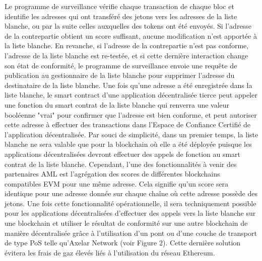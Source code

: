 ﻿\documentclass[a4paper]{article}
\begin{document}
Le programme de surveillance vérifie chaque transaction de chaque bloc et identifie les adresses qui ont transféré des jetons vers les adresses de la liste blanche, ou par la suite celles auxquelles des tokens ont été envoyés. Si l'adresse de la contrepartie obtient un score suffisant, aucune modification n'est apportée à la liste blanche. En revanche, si l'adresse de la contrepartie n'est pas conforme, l'adresse de la liste blanche est re-testée, et si cette dernière interaction change son état de conformité, le programme de surveillance envoie une requête de publication au gestionnaire de la liste blanche pour supprimer l'adresse du destinataire de la liste blanche.
Une fois qu'une adresse a été enregistrée dans la liste blanche, le smart contract d’une application décentralisée tierce peut appeler une fonction du smart contrat de la liste blanche qui renverra une valeur booléenne "vrai" pour confirmer que l'adresse est bien conforme, et peut autoriser cette adresse à effectuer des transactions dans l’Espace de Confiance Certifié de l’application décentralisée.
Par souci de simplicité, dans un premier temps, la liste blanche ne sera valable que pour la blockchain où elle a été déployée puisque les applications décentralisées devront effectuer des appels de fonction au smart contrat de la liste blanche. Cependant, l'une des fonctionnalités à venir des partenaires AML est l'agrégation des scores de différentes blockchains compatibles EVM pour une même adresse. Cela signifie qu'un score sera identique pour une adresse donnée sur chaque chaîne où cette adresse possède des jetons. Une fois cette fonctionnalité opérationnelle, il sera techniquement possible pour les applications décentralisées d’effectuer des appels vers la liste blanche sur une blockchain et utiliser le résultat de conformité sur une autre blockchain de manière décentralisée grâce à l'utilisation d'un pont ou d'une couche de transport de type PoS telle qu'Axelar Network (voir Figure 2). 
Cette dernière solution évitera les frais de gaz élevés liés à l'utilisation du réseau Ethereum. \\
\end{document}
